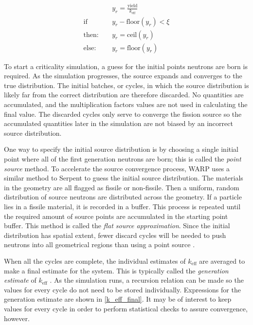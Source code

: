 \begin{equation}
\label{stoch_rounding}
\begin{split}
&y_r = \frac{\mathrm{yield}}{k_\mathrm{eff}} \\
\mathrm{if}\quad &y_r - \mathrm{floor}(y_r)<\xi \\
\mathrm{then:}\quad &y_r=\mathrm{ceil}(y_r) \\
\mathrm{else:}\quad &y_r=\mathrm{floor}(y_r)
\end{split}
\end{equation}

To start a criticality simulation, a guess for the initial points neutrons are born is required. As the simulation progresses, the source expands and converges to the true distribution.  The initial batches, or cycles, in which the source distribution is likely far from the correct distribution are therefore discarded.  No quantities are accumulated, and the multiplication factors values are not used in calculating the final value.  The discarded cycles only serve to converge the fission source so the accumulated quantities later in the simulation are not biased by an incorrect source distribution.  

One way to specify the initial source distribution is by choosing a single initial point where all of the first generation neutrons are born; this is called the \emph{point source} method. To accelerate the source convergence process, WARP uses a similar method to Serpent to guess the initial source distribution.  The materials in the geometry are all flagged as fissile or non-fissile.  Then a uniform, random distribution of source neutrons are distributed across the geometry.  If a particle lies in a fissile material, it is recorded in a buffer.  This process is repeated until the required amount of source points are accumulated in the starting point buffer.  This method is called the \emph{flat source approximation}. Since the initial distribution has spatial extent, fewer discard cycles will be needed to push neutrons into all geometrical regions than using a point source \cite{jaakko}.

When all the cycles are complete, the individual estimates of $k_\mathrm{eff}$ are averaged to make a final estimate for the system.  This is typically called the \emph{generation estimate} of $k_\mathrm{eff}$ \cite{jaakko}.  As the simulation runs, a recursion relation can be made so the values for every cycle do not need to be stored individually.  Expressions for the generation estimate are shown in \eqref{k_eff_final}.  It may be of interest to keep values for every cycle in order to perform statistical checks to assure convergence, however.

